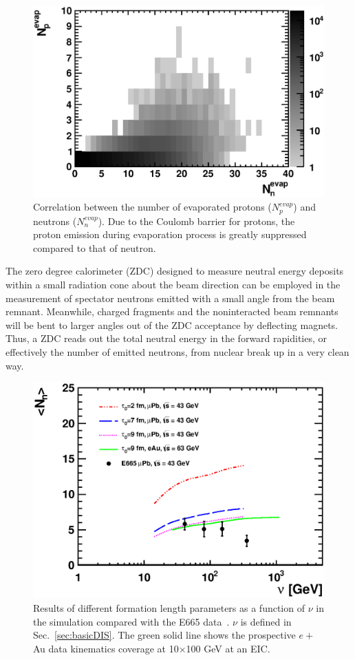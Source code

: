 \begin{figure}
\begin{center}
\includegraphics[width=0.7\columnwidth,keepaspectratio]{plots/chpt7/evap_protonVsneutron_black.eps}
\caption[Correlation between the number of protons ($N^{evap}_{p}$) and neutrons ($N^{evap}_{n}$) during evaporation process]{Correlation between the number of evaporated protons ($N^{evap}_{p}$) and neutrons ($N^{evap}_{n}$). Due
to the Coulomb barrier for protons, the proton emission during
evaporation process is greatly suppressed compared to that of neutron.}
\label{fig:evapNeutronVsProton}
\end{center}
\end{figure}

The zero degree calorimeter (ZDC) designed to measure neutral energy deposits
within a small radiation cone about the beam direction can be employed in the
measurement of spectator neutrons emitted with a small angle from the beam
remnant. Meanwhile, charged fragments and the noninteracted
beam remnants will be bent to larger angles out of the ZDC acceptance by
deflecting magnets. Thus, a ZDC reads out the total
neutral energy in the forward rapidities, or effectively the number of
emitted neutrons, from nuclear break up in a very clean way.

\begin{figure}
\begin{center}
\includegraphics[width=0.7\columnwidth,keepaspectratio]{plots/chpt7/tau_comparison.eps}
\caption[Average neutron number from evaporation process versus $\nu$ compared to the E665 measurement]{Results of different formation length parameters as a function of $\nu$ in the simulation compared with the E665 data~\cite{Adams:1995nu}. $\nu$ is defined in Sec.~\ref{sec:basicDIS}. The green solid line shows the prospective $e+$Au data kinematics coverage at 10$\times$100 GeV at an EIC.}
\label{fig:tauCompare}
\end{center}
\end{figure}

